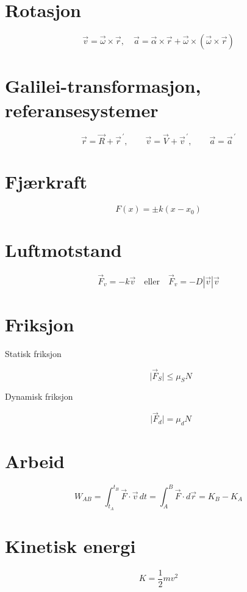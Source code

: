 \documentclass[a4paper,9pt]{extarticle}
\begin{document}
\begin{multicols}{2}
\section*{Rotasjon}
\[
\vec{v} = \vec{\omega} \times \vec{r}, \quad \vec{a} = \vec{\alpha} \times \vec{r} + \vec{\omega} \times (\vec{\omega} \times \vec{r})
\]



\section*{Galilei-transformasjon, referansesystemer}

\[
\vec{r} = \vec{R} + \vec{r}^{\,\prime}, \qquad \vec{v} = \vec{V} + \vec{v}^{\,\prime}, \qquad \vec{a} = \vec{a}^{\,\prime}
\]




\section*{{Fjærkraft}}
\[ F(x) = \pm k(x - x_0) \]



\section*{Luftmotstand}
\[ \vec{F}_v = - k \vec{v} \quad \text{eller} \quad \vec{F}_v = - D |\vec{v}| \vec{v} \]


\section*{Friksjon}
\begin{description}
\item [Statisk friksjon] \[ \big|\vec{F}_S\big| \leq \mu_S N \]
\item [Dynamisk friksjon] \[ \big|\vec{F}_d\big| = \mu_d N \]
\end{description}


\section*{Arbeid}
\[ W_{AB} = \int_{t_A}^{t_B} \vec{F} \cdot \vec{v} \, dt = \int_{A}^{B} \vec{F} \cdot d\vec{r} = K_B - K_A \]


\section*{Kinetisk energi}
\[ K = \frac{1}{2} m v^2 \]



\end{multicols}
\end{document}
